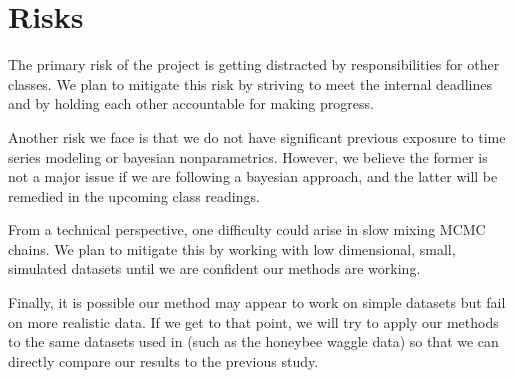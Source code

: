 \documentclass[12pt]{article}
\begin{document}
\section{Risks}
The primary risk of the project is getting distracted by responsibilities for other classes. We plan to mitigate this risk by striving to meet the internal deadlines and by holding each other accountable for making progress.

Another risk we face is that we do not have significant previous exposure to time series modeling or bayesian nonparametrics. However, we believe the former is not a major issue if we are following a bayesian approach, and the latter will be remedied in the upcoming class readings.


From a technical perspective, one difficulty could arise in slow mixing MCMC chains. We plan to mitigate this by working with low dimensional, small, simulated datasets until we are confident our methods are working.

Finally, it is possible our method may appear to work on simple datasets but fail on more realistic data. If we get to that point, we will try to apply our methods to the same datasets used in \cite{fox_nonparametric_2009} (such as the honeybee waggle data) so that we can directly compare our results to the previous study.

\newpage


\end{document}
